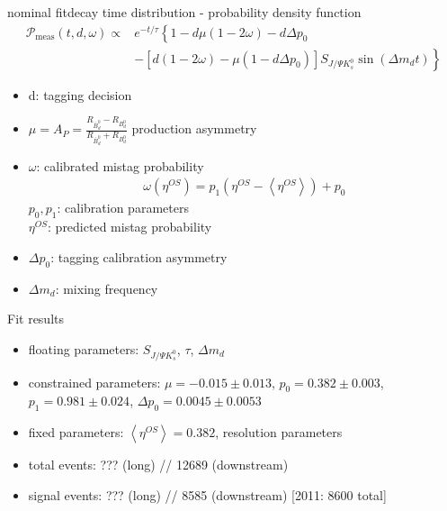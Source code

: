 \documentclass{beamer}
\newcommand{\SJPsi}{S_{J/\Psi K_s^0}}
\begin{document}
	\begin{frame}{nominal fit}{decay time distribution - probability density function}
	\begin{align}
\nonumber\mathcal{P}_{\text{meas}}(t, d, \omega) \propto &e^{-t/\tau} \left\lbrace 1-d\mu(1-2\omega)-d\Delta p_0 \right. \\
&- \left.\left[d(1-2\omega)-\mu(1-d\Delta p_0)\right]\SJPsi\sin(\Delta m_d t)\right\rbrace
	\end{align}
	
	\begin{itemize}
		\item d: tagging decision
		\item $\mu = A_P = \frac{R_{\bar{B}_d^0}-R_{B_d^0}}{R_{\bar{B}_d^0}+R_{B_d^0}}$ production asymmetry
		\item $\omega$: calibrated mistag probability
		      \begin{align}
		      \omega(\eta^{OS}) = p_1 (\eta^{OS} - \left\langle \eta^{OS} \right\rangle) + p_0
		      \end{align}
		      $p_0, p_1$: calibration parameters \\
		      $\eta^{OS}$: predicted mistag probability
		\item $\Delta p_0$: tagging calibration asymmetry
		\item $\Delta m_d$: mixing frequency

	\end{itemize}	
	\end{frame}
	
	
	
	\begin{frame}{Fit results}
	\begin{itemize}
		\item floating parameters: $S_{J/\Psi K_s^0}$, $\tau$, $\Delta m_d$
		\item constrained parameters: $\mu = -0.015\pm0.013$, $p_0 = 0.382\pm0.003$, $p_1=0.981\pm0.024$, $\Delta p_0 = 0.0045\pm0.0053$
		\item fixed parameters: $\left\langle \eta^{OS} \right\rangle = 0.382$, resolution parameters
		\item total events: ??? (long) // 12689 (downstream)
		\item signal events: ??? (long) // 8585 (downstream) [2011: 8600 total]
	\end{itemize}
	\end{frame}
\end{document}
